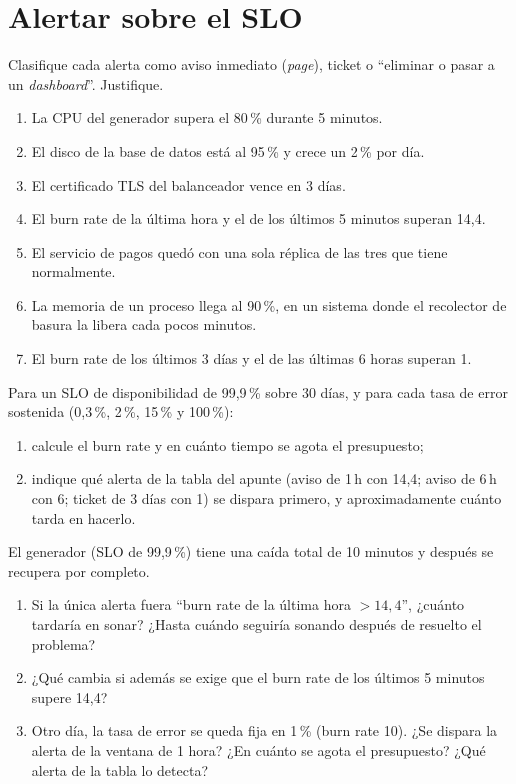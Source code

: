 \documentclass[variant=guia,cover=institutional,mode=screen]{ua-engineering-v6-article}
\begin{document}
\section{Alertar sobre el SLO}
\begin{uaexercise}
Clasifique cada alerta como aviso inmediato (\emph{page}), ticket o ``eliminar o pasar a un \emph{dashboard}''. Justifique.
\begin{enumerate}
\item La CPU del generador supera el 80\,\% durante 5 minutos.
\item El disco de la base de datos está al 95\,\% y crece un 2\,\% por día.
\item El certificado TLS del balanceador vence en 3 días.
\item El burn rate de la última hora y el de los últimos 5 minutos superan 14,4.
\item El servicio de pagos quedó con una sola réplica de las tres que tiene normalmente.
\item La memoria de un proceso llega al 90\,\%, en un sistema donde el recolector de basura la libera cada pocos minutos.
\item El burn rate de los últimos 3 días y el de las últimas 6 horas superan 1.
\end{enumerate}
\end{uaexercise}

\begin{uaexercise}
Para un SLO de disponibilidad de 99,9\,\% sobre 30 días, y para cada tasa de error sostenida (0,3\,\%, 2\,\%, 15\,\% y 100\,\%):
\begin{enumerate}
\item calcule el burn rate y en cuánto tiempo se agota el presupuesto;
\item indique qué alerta de la tabla del apunte (aviso de 1\,h con 14,4; aviso de 6\,h con 6; ticket de 3 días con 1) se dispara primero, y aproximadamente cuánto tarda en hacerlo.
\end{enumerate}
\end{uaexercise}

\begin{uaexercise}
El generador (SLO de 99,9\,\%) tiene una caída total de 10 minutos y después se recupera por completo.
\begin{enumerate}
\item Si la única alerta fuera ``burn rate de la última hora $> 14{,}4$'', ¿cuánto tardaría en sonar? ¿Hasta cuándo seguiría sonando después de resuelto el problema?
\item ¿Qué cambia si además se exige que el burn rate de los últimos 5 minutos supere 14,4?
\item Otro día, la tasa de error se queda fija en 1\,\% (burn rate 10). ¿Se dispara la alerta de la ventana de 1 hora? ¿En cuánto se agota el presupuesto? ¿Qué alerta de la tabla lo detecta?
\end{enumerate}
\end{uaexercise}
\end{document}

